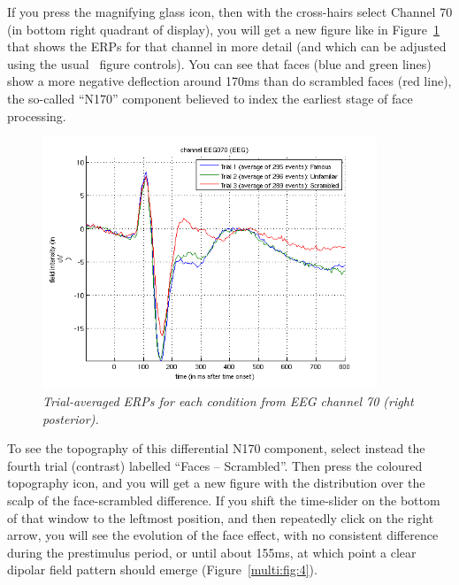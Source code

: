 If you press the magnifying glass icon, then with the cross-hairs select Channel 70 (in bottom right quadrant of display), you will get a new figure like in Figure~\ref{multi:fig:3} that shows the ERPs for that channel in more detail (and which can be adjusted using the usual \matlab\ figure controls). You can see that faces (blue and green lines) show a more negative deflection around 170ms than do scrambled faces (red line), the so-called ``N170'' component believed to index the earliest stage of face processing.

\begin{figure}
\begin{center}
\includegraphics[width=100mm]{multi/figures/figure3}
\caption{\em Trial-averaged ERPs for each condition from EEG channel 70 (right posterior). \label{multi:fig:3}}
\end{center}
\end{figure}

To see the topography of this differential N170 component, select instead the fourth trial (contrast) labelled ``Faces -- Scrambled''. Then press the coloured topography icon, and you will get a new figure with the distribution over the scalp of the face-scrambled difference. If you shift the time-slider on the bottom of that window to the leftmost position, and then repeatedly click on the right arrow, you will see the evolution of the face effect, with no consistent difference during the prestimulus period, or until about 155ms, at which point a clear dipolar field pattern should emerge (Figure~\ref{multi:fig:4}). 

